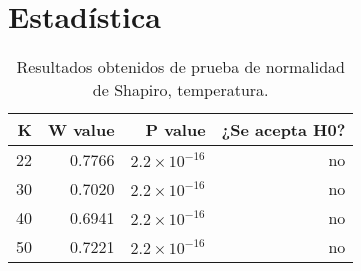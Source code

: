 \documentclass{elsarticle}
\begin{document}
\section{Estad\'istica}
\begin{table}[ht]
    \centering
    \caption{Resultados obtenidos de prueba de normalidad de Shapiro, temperatura.} 
    \begin{tabular}{|r|r|r|r|}
    \hline
    K & W value & P value & ¿Se acepta H0?  \\
    \hline
    22 & 0.7766 & $2.2\times 10^{-16}$ & no \\
    \hline 
    30 & 0.7020 & $2.2\times 10^{-16}$ & no  \\
    \hline 
    40 & 0.6941 & $2.2\times 10^{-16}$ & no \\
    \hline
    50 & 0.7221 & $2.2\times 10^{-16}$ & no \\
    \hline 
\end{tabular}
    \label{cuadro 1}
\end{table}
\end{document}
